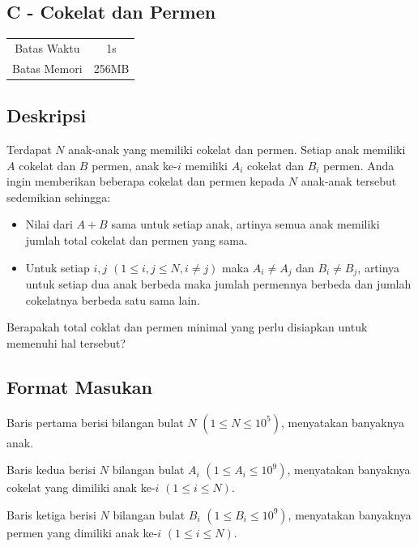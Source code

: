 \documentclass{article}
\begin{document}
\begin{center}
    \section*{C - Cokelat dan Permen} %

    \begin{tabular}{ | c c | }
        \hline
        Batas Waktu  & 1s \\    %
        Batas Memori & 256MB \\  %
        \hline
    \end{tabular}
\end{center}

\subsection*{Deskripsi}
Terdapat $N$ anak-anak yang memiliki cokelat dan permen. Setiap anak memiliki $A$ cokelat dan $B$ permen, anak ke-$i$ memiliki $A_i$ cokelat dan $B_i$ permen. Anda ingin memberikan beberapa cokelat dan permen kepada $N$ anak-anak tersebut sedemikian sehingga:

\begin{itemize}
\item Nilai dari $A + B$ sama untuk setiap anak, artinya semua anak memiliki jumlah total cokelat dan permen yang sama.
\item Untuk setiap $i, j$ $(1 \leq i, j \leq N, i \neq j)$ maka $A_i \neq A_j$ dan $B_i \neq B_j$, artinya untuk setiap dua anak berbeda maka jumlah permennya berbeda dan jumlah cokelatnya berbeda satu sama lain.
\end{itemize}

Berapakah total coklat dan permen minimal yang perlu disiapkan untuk memenuhi hal tersebut?
 	
\subsection*{Format Masukan}

Baris pertama berisi bilangan bulat $N$ $(1 \leq N \leq 10^5)$, menyatakan banyaknya anak.

Baris kedua berisi $N$ bilangan bulat $A_i$ $(1 \leq A_i \leq 10^{9})$, menyatakan banyaknya cokelat yang dimiliki anak ke-$i$ $(1 \leq i \leq N)$.

Baris ketiga berisi $N$ bilangan bulat $B_i$ $(1 \leq B_i \leq 10^{9})$, menyatakan banyaknya permen yang dimiliki anak ke-$i$ $(1 \leq i \leq N)$.
\end{document}
